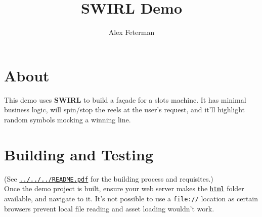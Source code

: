 \documentclass[11pt]{article}
\author{Alex Feterman}
\title{SWIRL Demo}
\newcommand{\link}[2]{\textcolor{darkteal}{\href{#1}{#2}}}
\newcommand{\filepath}[1]{\colorbox{superlightyellow}{\texttt{#1}}}
\begin{document}
\section*{About}
This demo uses \textbf{SWIRL} to build a fa\c{c}ade for a slots machine. It has minimal business
logic, will spin/stop the reels at the user's request, and it'll highlight random symbols mocking
a winning line.

\section*{Building and Testing}
(See \filepath{\link{file://../../../README.pdf}{../../../README.pdf}} for the building process and requisites.)\\

Once the demo project is built, ensure your web server makes the \filepath{\link{file://./html}{html}} folder
available, and navigate to it. It's not possible to use a \texttt{file://} location as certain browsers prevent
local file reading and asset loading wouldn't work.
\end{document}
